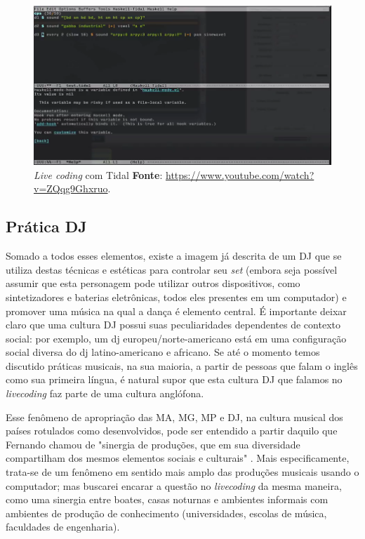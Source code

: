 \begin{figure}
\begin{center}
\includegraphics[scale=0.5]{./imagens/tidal.png}
\caption{\emph{Live coding} com Tidal \textbf{Fonte}: \url{https://www.youtube.com/watch?v=ZQqg9Ghxruo}.}
\label{fig:lc_tidal}
\end{center}
\end{figure}

\subsection{Prática DJ}\label{sec:musica_vanguarda_pista}

Somado a todos esses elementos, existe a imagem já descrita de um DJ que se utiliza destas técnicas e estéticas para controlar seu \emph{set} (embora seja possível assumir que esta personagem pode utilizar outros dispositivos, como sintetizadores e baterias eletrônicas, todos eles presentes em um computador) e promover uma música na qual a dança é elemento central. É importante deixar claro que uma cultura DJ possui suas peculiaridades dependentes de contexto social: por exemplo, um dj europeu/norte-americano está em uma configuração social diversa do dj latino-americano e africano. Se até o momento temos discutido práticas musicais, na sua maioria, a partir de pessoas que falam o inglês como sua primeira língua, é natural supor que esta cultura DJ que falamos no \emph{livecoding} faz parte de uma cultura anglófona.

Esse fenômeno de apropriação das MA, MG, MP e DJ, na cultura musical dos países rotulados como desenvolvidos, pode ser entendido a partir daquilo que Fernando   chamou de "sinergia de produções, que em sua diversidade compartilham dos mesmos elementos sociais e culturais" \cite[p.~152]{iazzetta_musica_2009}. Mais especificamente, trata-se de um fenômeno em sentido mais amplo das produções musicais usando o computador; mas buscarei encarar a questão no \emph{livecoding} da mesma maneira, como uma sinergia entre boates, casas noturnas e ambientes informais com ambientes de produção de conhecimento (universidades, escolas de música, faculdades de engenharia).

